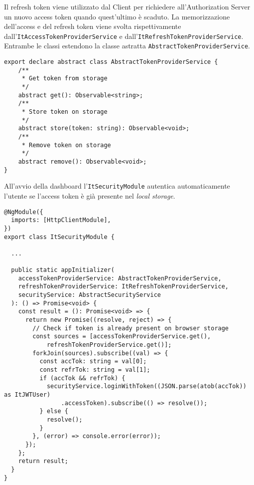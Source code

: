 \FloatBarrier 
Il refresh token viene utilizzato dal Client per richiedere all'Authorization Server un nuovo access token quando quest'ultimo è scaduto.
La memorizzazione dell'access e del refresh token viene svolta rispettivamente dall'\verb|ItAccessTokenProviderService| e dall'\verb|ItRefreshTokenProviderService|.
Entrambe le classi estendono la classe astratta \verb|AbstractTokenProviderService|.\\
\begin{lstlisting}[caption={Classe astratta AbstractTokenProviderService}, style=javaScriptCode]
export declare abstract class AbstractTokenProviderService {
    /**
     * Get token from storage
     */
    abstract get(): Observable<string>;
    /**
     * Store token on storage
     */
    abstract store(token: string): Observable<void>;
    /**
     * Remove token on storage
     */
    abstract remove(): Observable<void>;
}
\end{lstlisting}
All'avvio della dashboard l'\verb|ItSecurityModule| autentica automaticamente l'utente se l'access token è già presente nel \textit{local storage}.\newline
\begin{lstlisting}[caption={Login con token nell'ItSecurityModule}, style=javaScriptCode]
@NgModule({
  imports: [HttpClientModule],
})
export class ItSecurityModule {
    
  ...

  public static appInitializer(
    accessTokenProviderService: AbstractTokenProviderService,
    refreshTokenProviderService: ItRefreshTokenProviderService,
    securityService: AbstractSecurityService
  ): () => Promise<void> {
    const result = (): Promise<void> => {
      return new Promise((resolve, reject) => {
        // Check if token is already present on browser storage
        const sources = [accessTokenProviderService.get(), 
            refreshTokenProviderService.get()];
        forkJoin(sources).subscribe((val) => {
          const accTok: string = val[0];
          const refrTok: string = val[1];
          if (accTok && refrTok) {
            securityService.loginWithToken((JSON.parse(atob(accTok)) as ItJWTUser)
                .accessToken).subscribe(() => resolve());
          } else {
            resolve();
          }
        }, (error) => console.error(error));
      });
    };
    return result;
  }
}
\end{lstlisting}
\pagebreak
